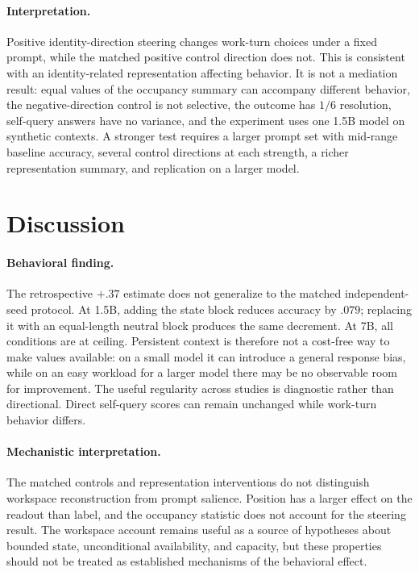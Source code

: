 \documentclass[11pt]{article}
\begin{document}
\paragraph{Interpretation.} Positive identity-direction steering changes work-turn choices under a fixed prompt, while the matched positive control direction does not. This is consistent with an identity-related representation affecting behavior. It is not a mediation result: equal values of the occupancy summary can accompany different behavior, the negative-direction control is not selective, the outcome has $1/6$ resolution, self-query answers have no variance, and the experiment uses one 1.5B model on synthetic contexts. A stronger test requires a larger prompt set with mid-range baseline accuracy, several control directions at each strength, a richer representation summary, and replication on a larger model.

\section{Discussion}
\label{sec:discussion}
\paragraph{Behavioral finding.} The retrospective $+.37$ estimate does not generalize to the matched independent-seed protocol. At 1.5B, adding the state block reduces accuracy by $.079$; replacing it with an equal-length neutral block produces the same decrement. At 7B, all conditions are at ceiling. Persistent context is therefore not a cost-free way to make values available: on a small model it can introduce a general response bias, while on an easy workload for a larger model there may be no observable room for improvement. The useful regularity across studies is diagnostic rather than directional. Direct self-query scores can remain unchanged while work-turn behavior differs.

\paragraph{Mechanistic interpretation.} The matched controls and representation interventions do not distinguish workspace reconstruction from prompt salience. Position has a larger effect on the readout than label, and the occupancy statistic does not account for the steering result. The workspace account remains useful as a source of hypotheses about bounded state, unconditional availability, and capacity, but these properties should not be treated as established mechanisms of the behavioral effect.
\end{document}
